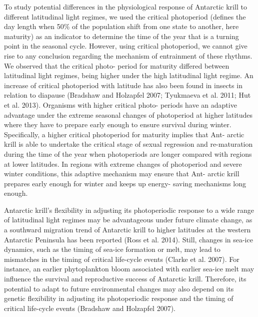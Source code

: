 To study potential differences in the physiological response of Antarctic krill
to different latitudinal light regimes, we used the critical photoperiod
(defines the day length when 50\% of the population shift from one state to
another, here maturity) as an indicator to determine the time of the year that
is a turning point in the seasonal cycle. However, using critical photoperiod,
we cannot give rise to any conclusion regarding the mechanism of entrainment of
these rhythms. We observed that the critical photo- period for maturity
differed between latitudinal light regimes, being higher under the high
latitudinal light regime. An increase of critical photoperiod with latitude has
also been found in insects in relation to diapause (Bradshaw and Holzapfel
2007; Tyukmaeva et al. 2011; Hut et al. 2013). Organisms with higher critical
photo- periods have an adaptive advantage under the extreme seasonal changes of
photoperiod at higher latitudes where they have to prepare early enough to
ensure survival during winter. Specifically, a higher critical photoperiod for
maturity implies that Ant- arctic krill is able to undertake the critical stage
of sexual regression and re-maturation during the time of the year when
photoperiods are longer compared with regions at lower latitudes. In regions
with extreme changes of photoperiod and severe winter conditions, this adaptive
mechanism may ensure that Ant- arctic krill prepares early enough for winter
and keeps up energy- saving mechanisms long enough. 

Antarctic krill’s flexibility in adjusting its photoperiodic response to a wide
range of latitudinal light regimes may be advantageous under future climate
change, as a southward migration trend of Antarctic krill to higher latitudes
at the western Antarctic Peninsula has been reported (Ross et al. 2014). Still,
changes in sea-ice dynamics, such as the timing of sea-ice formation or melt,
may lead to mismatches in the timing of critical life-cycle events (Clarke et
al. 2007). For instance, an earlier phytoplankton bloom associated with earlier
sea-ice melt may influence the survival and reproductive success of Antarctic
krill. Therefore, its potential to adapt to future environmental changes may
also depend on its genetic flexibility in adjusting its photoperiodic response
and the timing of critical life-cycle events (Bradshaw and Holzapfel 2007). 

